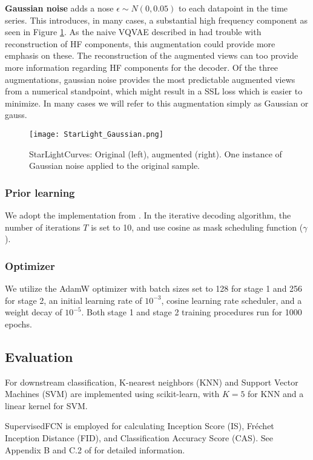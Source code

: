\documentclass[../../thesis.tex]{subfiles}
\begin{document}
\textbf{Gaussian noise} adds a nose $\epsilon \sim N(0,0.05)$ to each datapoint in the time series. This introduces, in many cases, a substantial high frequency component as seen in Figure \ref{fig:StarLight_Gaussian}. As the naive VQVAE described in \cite{TimeVQVAE} had trouble with reconstruction of HF components, this augmentation could provide more emphasis on these. The reconstruction of the augmented views can too provide more information regarding HF components for the decoder. Of the three augmentations, gaussian noise provides the most predictable augmented views from a numerical standpoint, which might result in a SSL loss which is easier to minimize. In many cases we will refer to this augmentation simply as Gaussian or gauss.
\begin{figure}[h]
    \texttt{[image: StarLight\_Gaussian.png]}
    \centering
    \caption{StarLightCurves: Original (left), augmented (right). One instance of Gaussian noise applied to the original sample.}
    \label{fig:StarLight_Gaussian}
\end{figure}


\subsubsection{Prior learning}
We adopt the implementation from \cite{chang2022maskgit}. In the iterative decoding algorithm, the number of iterations $T$ is set to 10, and use cosine as mask scheduling function ($\gamma$). 

\subsubsection{Optimizer}
We utilize the AdamW optimizer with batch sizes set to 128 for stage 1 and 256 for stage 2, an initial learning rate of $10^{-3}$, cosine learning rate scheduler, and a weight decay of $10^{-5}$. Both stage 1 and stage 2 training procedures run for 1000 epochs.


\subsection{Evaluation}
For downstream classification, K-nearest neighbors (KNN) and Support Vector Machines (SVM) are implemented using scikit-learn, with $K=5$ for KNN and a linear kernel for SVM. \newline

SupervisedFCN is employed for calculating Inception Score (IS), Fréchet Inception Distance (FID), and Classification Accuracy Score (CAS). See Appendix B and C.2 of \cite{VQVAE} for detailed information.
\end{document}

